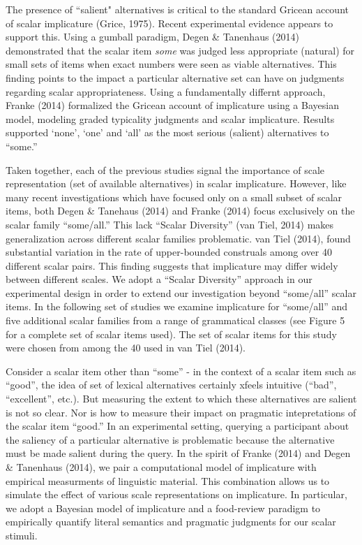 \documentclass[10pt, letterpaper]{article}
\begin{document}
The presence of ``salient" alternatives is critical to the standard
Gricean account of scalar implicature (Grice, 1975). Recent experimental
evidence appears to support this. Using a gumball paradigm, Degen \&
Tanenhaus (2014) demonstrated that the scalar item \emph{some} was
judged less appropriate (natural) for small sets of items when exact
numbers were seen as viable alternatives. This finding points to the
impact a particular alternative set can have on judgments regarding
scalar appropriateness. Using a fundamentally differnt approach, Franke
(2014) formalized the Gricean account of implicature using a Bayesian
model, modeling graded typicality judgments and scalar implicature.
Results supported `none', `one' and `all' as the most serious (salient)
alternatives to ``some.''

Taken together, each of the previous studies signal the importance of
scale representation (set of available alternatives) in scalar
implicature. However, like many recent investigations which have focused
only on a small subset of scalar items, both Degen \& Tanehaus (2014)
and Franke (2014) focus exclusively on the scalar family ``some/all.''
This lack ``Scalar Diversity'' (van Tiel, 2014) makes generalization
across different scalar families problematic. van Tiel (2014), found
substantial variation in the rate of upper-bounded construals among over
40 different scalar pairs. This finding suggests that implicature may
differ widely between different scales. We adopt a ``Scalar Diversity''
approach in our experimental design in order to extend our investigation
beyond ``some/all'' scalar items. In the following set of studies we
examine implicature for ``some/all'' and five additional scalar families
from a range of grammatical classes (see Figure 5 for a complete set of
scalar items used). The set of scalar items for this study were chosen
from among the 40 used in van Tiel (2014).

Consider a scalar item other than ``some'' - in the context of a scalar
item such as ``good'', the idea of set of lexical alternatives certainly
xfeels intuitive (``bad'', ``excellent'', etc.). But measuring the
extent to which these alternatives are salient is not so clear. Nor is
how to measure their impact on pragmatic intepretations of the scalar
item ``good.'' In an experimental setting, querying a participant about
the saliency of a particular alternative is problematic because the
alternative must be made salient during the query. In the spirit of
Franke (2014) and Degen \& Tanenhaus (2014), we pair a computational
model of implicature with empirical measurments of linguistic material.
This combination allows us to simulate the effect of various scale
representations on implicature. In particular, we adopt a Bayesian model
of implicature and a food-review paradigm to empirically quantify
literal semantics and pragmatic judgments for our scalar stimuli.
\end{document}
